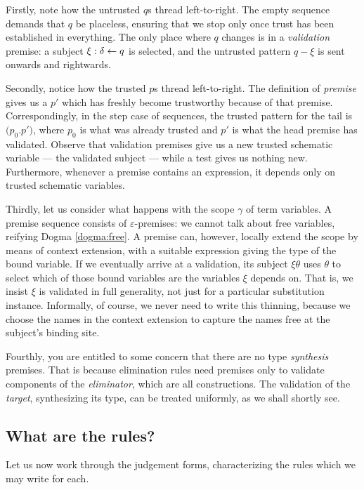 \documentclass{jfp1}
\newcommand{\emp}{\varepsilon}
\newcommand{\Pa}[1]{\texttt{(}#1\texttt{)}}
\newcommand{\dt}{\texttt{.}}
\newcommand{\cn}[2]{\Pa{#1 \dt #2}}
\begin{document}
Firstly, note how the untrusted $q$s thread left-to-right. The empty
sequence demands that $q$ be placeless, ensuring that we stop only
once trust has been established in everything. The only place where
$q$ changes is in a \emph{validation} premise: a subject
$\xi : \delta\leftarrow q$ is selected, and the untrusted pattern $q-\xi$
is sent onwards and rightwards.

Secondly, notice how the trusted $p$s thread left-to-right. The
definition of \emph{premise} gives us a $p'$ which has
freshly become trustworthy because of that premise. Correspondingly,
in the step case of sequences, the trusted pattern for the tail is
$\cn{p_0}{p'}$, where $p_0$ is what was already trusted and $p'$
is what the head premise has validated. Observe that validation
premises give us a new trusted schematic variable --- the validated
subject --- while a test gives us nothing new. Furthermore, whenever
a premise contains an expression, it depends only on trusted
schematic variables.

Thirdly, let us consider what happens with the scope $\gamma$ of term
variables. A premise sequence consists of $\emp$-premises: we cannot
talk about free variables, reifying Dogma \ref{dogma:free}. A premise can,
however, locally extend the scope by means of context extension, with
a suitable expression giving the type of the bound variable. If we
eventually arrive at a validation, its subject $\xi\theta$ uses
$\theta$ to select which of those bound variables are the variables
$\xi$ depends on. That is, we insist $\xi$ is validated in full
generality, not just for a particular substitution
instance. Informally, of course, we never need to write this thinning,
because we choose the names in the context extension to capture the
names free at the subject's binding site.

Fourthly, you are entitled to some concern that there are no type
\emph{synthesis} premises. That is because elimination rules need
premises only to validate components of the \emph{eliminator}, which
are all constructions. The validation of the \emph{target},
synthesizing its type, can be treated uniformly, as we shall shortly
see.


\subsection{What are the rules?}

Let us now work through the judgement forms, characterizing the rules
which we may write for each.
\end{document}
